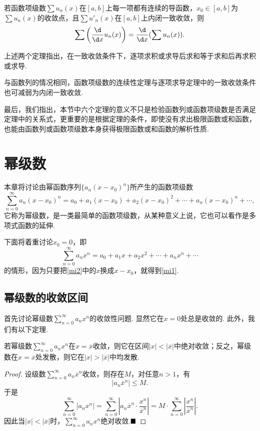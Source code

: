 \begin{theorem}[逐项求导]
	若函数项级数$\sum u_n(x)$在$\left[a,b\right]$上每一项都有连续的导函数，$x_0\in\left[a,b\right]$为$\sum u_n(x)$的收敛点，且$\sum u'_n(x)$在$\left[a,b\right]$上内闭一致收敛，则
	$$\sum\left(\frac{\d}{\d x}u_n(x)\right)=\frac{\d}{\d x}(\sum u_n(x)).$$
\end{theorem}
\begin{remark}
	上述两个定理指出，在一致收敛条件下，逐项求积或求导后求和等于求和后再求积或求导.
\end{remark}
\begin{remark}
	与函数列的情况相同，函数项级数的连续性定理与逐项求导定理中的一致收敛条件也可减弱为内闭一致收敛.
\end{remark}
最后，我们指出，本节中六个定理的意义不只是检验函数列或函数项级数是否满足定理中的关系式，更重要的是根据定理的条件，即使没有求出极限函数或和函数，也能由函数列或函数项级数本身获得极限函数或和函数的解析性质.
\section{幂级数}
本章将讨论由幂函数序列$\{a_n(x-x_0)^n\}$所产生的函数项级数
\begin{equation}\label{mi1}
	\sum_{n=0}^{\infty}a_n(x-x_0)^n=a_0+a_1(x-x_0)+a_2(x-x_0)^2+\cdots+a_n(x-x_0)^n+\cdots,
\end{equation}
它称为{\heiti 幂级数}，是一类最简单的函数项级数，从某种意义上说，它也可以看作是多项式函数的延伸.

下面将着重讨论$x_0=0$，即
\begin{equation}\label{mi2}
	\sum_{n=0}^{\infty}a_nx^n=a_0+a_1x+a_2x^2+\cdots+a_nx^n+\cdots
\end{equation}
的情形，因为只要把\ref{mi2}中的$x$换成$x-x_0$，就得到\ref{mi1}.
\subsection{幂级数的收敛区间}
首先讨论幂级数$\displaystyle\sum_{n=0}^{\infty}a_nx^n$的收敛性问题. 显然它在$x=0$处总是收敛的. 此外，我们有以下定理.
\begin{theorem}[Abel定理]
	若幂级数$\displaystyle\sum_{n=0}^{\infty}a_nx^n$在$x=\overline{x}$收敛，则它在区间$|x|<|\overline{x}|$中绝对收敛；反之，幂级数在$x=\overline{x}$处发散，则它在$|x|>|\overline{x}|$中均发散.
\end{theorem}
\begin{proof}
	设级数$\displaystyle\sum_{n=0}^{\infty}a_n\overline{x}^n$收敛，则存在$M$，对任意$n>1$，有
	$$|a_n\overline{x}^n|\leqslant M.$$
	于是
	$$\sum_{n=0}^{\infty}|a_nx^n|=\sum_{n=0}^{\infty}\left|a_n\overline{x}^n\cdot\frac{x^n}{\overline{x}^n}\right|=M\cdot\sum_{n=0}^{\infty}\left|\frac{x^n}{\overline{x}^n}\right|.$$
	因此当$|x|<|\overline{x}|$时，$\displaystyle\sum_{n=0}^{\infty}a_nx^n$绝对收敛.$\hfill\blacksquare$
\end{proof}

